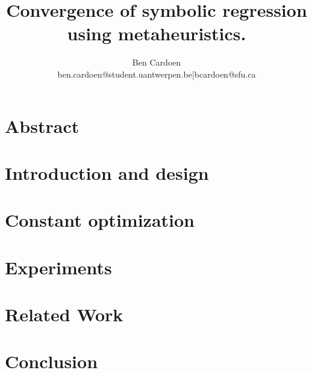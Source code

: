 \documentclass[twocolumn]{article}
\title{Convergence of symbolic regression using metaheuristics.
    }
\author{
    Ben Cardoen  \\
    {ben.cardoen@student.uantwerpen.be|bcardoen@sfu.ca}
}
\date{}
\begin{document}
    
    \maketitle
    \section{Abstract}
    
    \section{Introduction and design}
%    
    
    \section{Constant optimization}\label{secconstopt}
    
    \section{Experiments}\label{secexperiments}
    
    \section{Related Work}
    
%    
    \section{Conclusion}
    
    
    
    
\end{document}

